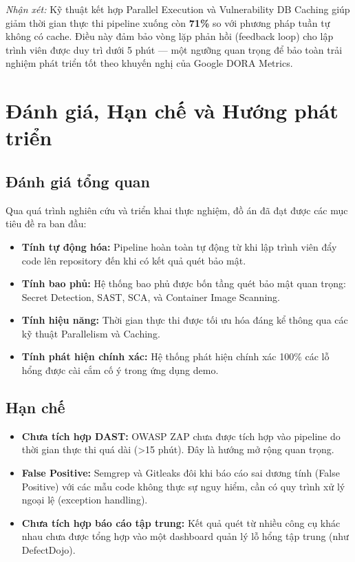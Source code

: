 \documentclass[12pt,a4paper]{report}
\begin{document}
\textit{Nhận xét:} Kỹ thuật kết hợp Parallel Execution và Vulnerability DB Caching giúp giảm thời gian thực thi pipeline xuống còn \textbf{71\%} so với phương pháp tuần tự không có cache. Điều này đảm bảo vòng lặp phản hồi (feedback loop) cho lập trình viên được duy trì dưới 5 phút --- một ngưỡng quan trọng để bảo toàn trải nghiệm phát triển tốt theo khuyến nghị của Google DORA Metrics.

\section{Đánh giá, Hạn chế và Hướng phát triển}

\subsection{Đánh giá tổng quan}

Qua quá trình nghiên cứu và triển khai thực nghiệm, đồ án đã đạt được các mục tiêu đề ra ban đầu:
\begin{itemize}[leftmargin=2cm]
    \item \textbf{Tính tự động hóa:} Pipeline hoàn toàn tự động từ khi lập trình viên đẩy code lên repository đến khi có kết quả quét bảo mật.
    \item \textbf{Tính bao phủ:} Hệ thống bao phủ được bốn tầng quét bảo mật quan trọng: Secret Detection, SAST, SCA, và Container Image Scanning.
    \item \textbf{Tính hiệu năng:} Thời gian thực thi được tối ưu hóa đáng kể thông qua các kỹ thuật Parallelism và Caching.
    \item \textbf{Tính phát hiện chính xác:} Hệ thống phát hiện chính xác 100\% các lỗ hổng được cài cắm cố ý trong ứng dụng demo.
\end{itemize}

\subsection{Hạn chế}

\begin{itemize}[leftmargin=2cm]
    \item \textbf{Chưa tích hợp DAST:} OWASP ZAP chưa được tích hợp vào pipeline do thời gian thực thi quá dài (>15 phút). Đây là hướng mở rộng quan trọng.
    \item \textbf{False Positive:} Semgrep và Gitleaks đôi khi báo cáo sai dương tính (False Positive) với các mẫu code không thực sự nguy hiểm, cần có quy trình xử lý ngoại lệ (exception handling).
    \item \textbf{Chưa tích hợp báo cáo tập trung:} Kết quả quét từ nhiều công cụ khác nhau chưa được tổng hợp vào một dashboard quản lý lỗ hổng tập trung (như DefectDojo).
\end{itemize}
\end{document}
